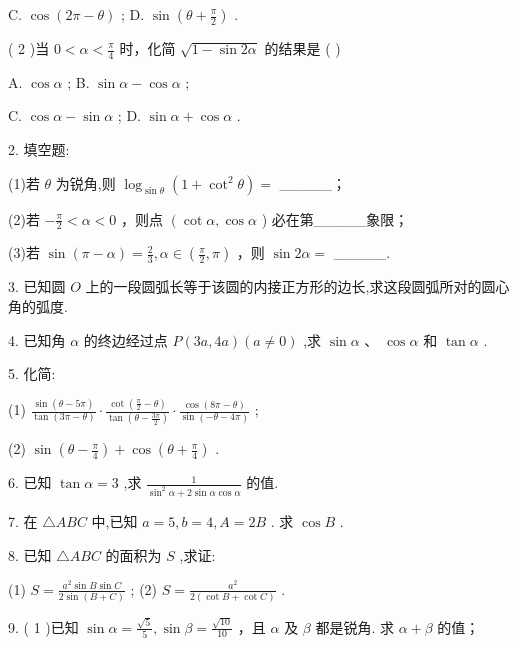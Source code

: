\documentclass[10pt]{article}
\begin{document}
C. \(\cos \left( {{2\pi } - \theta }\right)\) ; D. \(\sin \left( {\theta  + \frac{\pi }{2}}\right)\) .

( 2 )当 \(0 < \alpha  < \frac{\pi }{4}\) 时，化简 \(\sqrt{1 - \sin {2\alpha }}\) 的结果是 ( )

A. \(\cos \alpha\) ; B. \(\sin \alpha  - \cos \alpha\) ;

C. \(\cos \alpha  - \sin \alpha\) ; D. \(\sin \alpha  + \cos \alpha\) .

2. 填空题:

(1)若 \(\theta\) 为锐角,则 \({\log }_{\sin \theta }\left( {1 + {\cot }^{2}\theta }\right)  =\) \_\_\_\_\_；

(2)若 \(- \frac{\pi }{2} < \alpha  < 0\) ，则点 \(\left( \right. \cot \alpha ,\cos \alpha\) ) 必在第\_\_\_\_\_象限；

(3)若 \(\sin \left( {\pi  - \alpha }\right)  = \frac{2}{3},\alpha  \in  \left( {\frac{\pi }{2},\pi }\right)\) ，则 \(\sin {2\alpha } =\) \_\_\_\_\_.

3. 已知圆 \(O\) 上的一段圆弧长等于该圆的内接正方形的边长,求这段圆弧所对的圆心角的弧度.

4. 已知角 \(\alpha\) 的终边经过点 \(P\left( {{3a},{4a}}\right) \left( {a \neq  0}\right)\) ,求 \(\sin \alpha \text{ 、 }\cos \alpha\) 和 \(\tan \alpha\) .

5. 化简:

(1) \(\frac{\sin \left( {\theta  - {5\pi }}\right) }{\tan \left( {{3\pi } - \theta }\right) } \cdot  \frac{\cot \left( {\frac{\pi }{2} - \theta }\right) }{\tan \left( {\theta  - \frac{3\pi }{2}}\right) } \cdot  \frac{\cos \left( {{8\pi } - \theta }\right) }{\sin \left( {-\theta  - {4\pi }}\right) }\) ;

(2) \(\sin \left( {\theta  - \frac{\pi }{4}}\right)  + \cos \left( {\theta  + \frac{\pi }{4}}\right)\) .

6. 已知 \(\tan \alpha  = 3\) ,求 \(\frac{1}{{\sin }^{2}\alpha  + 2\sin \alpha \cos \alpha }\) 的值.

7. 在 \(\bigtriangleup {ABC}\) 中,已知 \(a = 5,b = 4,A = {2B}\) . 求 \(\cos B\) .

8. 已知 \(\bigtriangleup {ABC}\) 的面积为 \(S\) ,求证:

(1) \(S = \frac{{a}^{2}\sin B\sin C}{2\sin \left( {B + C}\right) }\) ; (2) \(S = \frac{{a}^{2}}{2\left( {\cot B + \cot C}\right) }\) .

9. ( 1 )已知 \(\sin \alpha  = \frac{\sqrt{5}}{5},\sin \beta  = \frac{\sqrt{10}}{10}\) ，且 \(\alpha\) 及 \(\beta\) 都是锐角. 求 \(\alpha  + \beta\) 的值；
\end{document}
